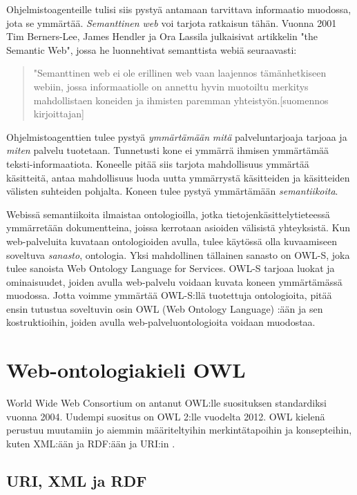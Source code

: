 \documentclass[finnish]{tktltiki2}
\theoremstyle{definition}
\theoremstyle{remark}
\begin{document}
Ohjelmistoagenteille tulisi siis pystyä antamaan tarvittava informaatio muodossa, jota se ymmärtää. \textit{Semanttinen web} voi tarjota ratkaisun tähän. Vuonna 2001 Tim Berners-Lee, James Hendler ja Ora Lassila julkaisivat artikkelin "the Semantic Web", jossa he
luonnehtivat semanttista webiä seuraavasti:
\begin{quote}
"Semanttinen web ei ole erillinen web vaan
laajennos tämänhetkiseen webiin, jossa informaatiolle on annettu hyvin muotoiltu
merkitys mahdollistaen koneiden ja ihmisten paremman yhteistyön.[suomennos kirjoittajan]\cite{semweb}
\end{quote}

Ohjelmistoagenttien tulee pystyä \textit{ymmärtämään} \textit{mitä} palveluntarjoaja tarjoaa ja \textit{miten} palvelu tuotetaan. Tunnetusti kone ei ymmärrä ihmisen ymmärtämää teksti-informaatiota. Koneelle pitää siis tarjota mahdollisuus ymmärtää käsitteitä, antaa mahdollisuus luoda uutta ymmärrystä käsitteiden ja käsitteiden välisten suhteiden pohjalta. Koneen tulee pystyä ymmärtämään \textit{semantiikoita}. 

Webissä semantiikoita ilmaistaa ontologioilla, jotka tietojenkäsittelytieteessä ymmärretään dokumentteina, joissa kerrotaan asioiden välisistä yhteyksistä\cite{semweb}. Kun web-palveluita kuvataan ontologioiden avulla, tulee käytössä olla kuvaamiseen soveltuva \textit{sanasto}, ontologia. Yksi mahdollinen tällainen sanasto on OWL-S, joka tulee sanoista Web Ontology Language for Services. OWL-S tarjoaa luokat ja ominaisuudet, joiden avulla web-palvelu voidaan kuvata koneen ymmärtämässä muodossa. Jotta voimme ymmärtää OWL-S:llä tuotettuja ontologioita, pitää ensin tutustua soveltuvin osin OWL (Web Ontology Language) :ään ja sen kostruktioihin, joiden avulla web-palveluontologioita voidaan muodostaa. 

\section{Web-ontologiakieli OWL}

World Wide Web Consortium on antanut OWL:lle suosituksen standardiksi vuonna 2004\cite{owlguide}. Uudempi suositus on OWL 2:lle vuodelta 2012. OWL kielenä perustuu muutamiin jo aiemmin määriteltyihin merkintätapoihin ja konsepteihin, kuten XML:ään ja RDF:ään ja URI:in .

\subsection{URI, XML ja RDF}
\end{document}
